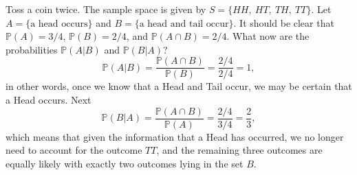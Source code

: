 \documentclass[captions=tableheading]{scrbook}
\begin{document}
\begin{example}
Toss a coin twice. The sample space is given by \(S=\{ HH,\ HT,\ TH,\ TT \} \). Let \(A= \{ \mbox{a head occurs} \} \) and \(B= \{ \mbox{a head and tail occur} \} \). It should be clear that \(\mathbb{P}(A)=3/4\), \(\mathbb{P}(B)=2/4\), and \(\mathbb{P}(A\cap B)=2/4\). What now are the probabilities \(\mathbb{P}(A|B)\) and \(\mathbb{P}(B|A)\)?
\[
\mathbb{P}(A|B)=\frac{\mathbb{P}(A\cap B)}{\mathbb{P}(B)}=\frac{2/4}{2/4}=1,
\]
in other words, once we know that a Head and Tail occur, we may be certain that a Head occurs. Next
\[
\mathbb{P}(B|A)=\frac{\mathbb{P}(A\cap B)}{\mathbb{P}(A)}=\frac{2/4}{3/4}=\frac{2}{3},
\]
which means that given the information that a Head has occurred, we no longer need to account for the outcome \(TT\), and the remaining three outcomes are equally likely with exactly two outcomes lying in the set \(B\). 
\end{example}
\end{document}
